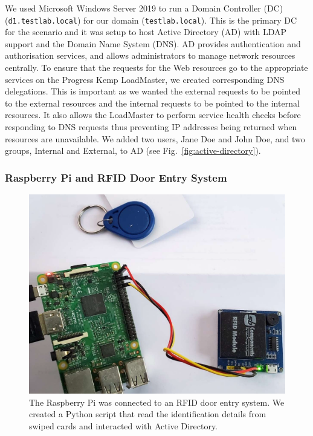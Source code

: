 We used Microsoft Windows Server 2019 to run a Domain Controller (DC)
(\texttt{d1.testlab.local}) for our domain (\texttt{testlab.local}).
This is the primary DC for the scenario and it was setup to host
Active Directory (AD) with LDAP support and the Domain Name System
(DNS).  AD provides authentication and authorisation services, and
allows administrators to manage network resources centrally.  To
ensure that the requests for the Web resources go to the appropriate
services on the Progress Kemp LoadMaster, we created corresponding DNS
delegations.  This is important as we wanted the external requests to
be pointed to the external resources and the internal requests to be
pointed to the internal resources.  It also allows the LoadMaster to
perform service health checks before responding to DNS requests thus
preventing IP addresses being returned when resources are unavailable.
We added two users, Jane Doe and John Doe, and two groups, Internal
and External, to AD (see Fig.~\ref{fig:active-directory}).

\subsubsection{Raspberry Pi and RFID Door Entry System}

\begin{figure}
  \centerline{\includegraphics[width=\columnwidth]{img/raspberry-pi-rfid}}
  \caption{The Raspberry Pi was connected to an RFID door entry
    system.  We created a Python script that read the identification
    details from swiped cards and interacted with Active
    Directory.}\label{fig:raspberry-pi-rfid}
\end{figure}

